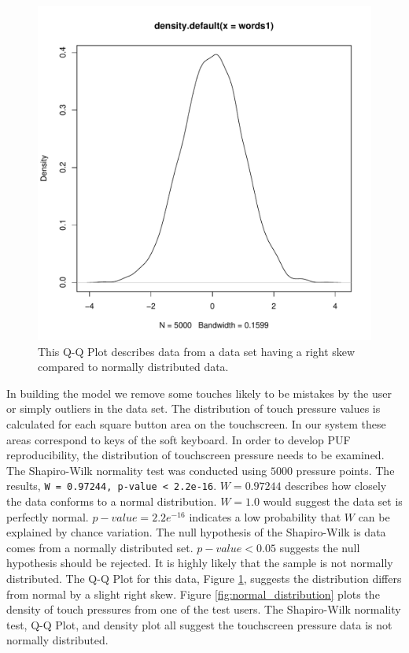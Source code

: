 \documentclass{acm_proc_article-sp}
\begin{document}
\begin{figure}
\centering
\includegraphics[page=4, width=.45\textwidth, keepaspectratio]{Rplots.pdf}
\caption{
This Q-Q Plot describes data from
a data set having a right skew compared to normally distributed data.
}
\label{fig:qq_plot}
\end{figure}

In building the model we remove some touches likely to be mistakes by the user or simply outliers in the data set.
The distribution of touch pressure values is calculated for each square button area on the touchscreen. 
In our system these areas correspond to keys of the soft keyboard.
In order to develop PUF reproducibility,
the distribution of touchscreen pressure needs to be examined.
%
The Shapiro-Wilk normality test\cite{shapiro1965analysis} was conducted
using $5000$ pressure points.
The results, {\tt W = 0.97244, p-value < 2.2e-16}.
$W=0.97244$ describes how closely the data conforms to a normal distribution.
$W=1.0$ would suggest the data set is perfectly normal.
$p-value=2.2e^{-16}$ indicates a low probability that
$W$ can be explained by chance variation.
%
The null hypothesis of the Shapiro-Wilk is
data comes from a normally distributed set.
$p-value<0.05$ suggests the null hypothesis should be rejected.
It is highly likely that the sample is not normally distributed.
%
The Q-Q Plot for this data, Figure \ref{fig:qq_plot},
suggests the distribution differs from normal
by a slight right skew.
%
Figure \ref{fig:normal_distribution} plots the density of 
touch pressures from one of the test users.
%
The Shapiro-Wilk normality test,
Q-Q Plot, 
and density plot
all suggest the touchscreen pressure data is not normally distributed.

\end{document}
